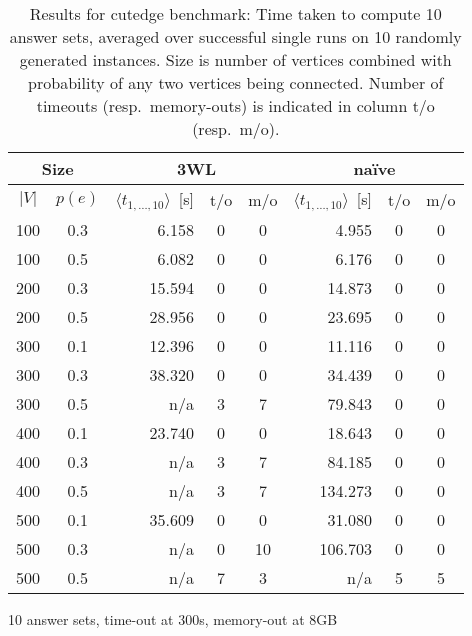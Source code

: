 \documentclass{vutinfth} %
\begin{document}
\begin{table}
\begin{center}
	\begin{tabular}{|cc||rcc|rcc|}
\hline
\multicolumn{2}{|c||}{Size} & \multicolumn{3}{c|}{3WL} & \multicolumn{3}{c|}{na\"{i}ve} \\
\hline
$|V|$ & $p(e)$& $\langle t_{1, \ldots, 10} \rangle$~[s]&t/o&m/o& $\langle t_{1, \ldots, 10} \rangle$~[s]&t/o&m/o\\
\hline
\hline
100 & 0.3 & 	  6.158 & 0 &  0 &	  4.955 & 0 & 0 \\
100 & 0.5 & 	  6.082 & 0 &  0 &	  6.176 & 0 & 0 \\
200 & 0.3 & 	 15.594 & 0 &  0 &	 14.873 & 0 & 0 \\
200 & 0.5 & 	 28.956 & 0 &  0 &	 23.695 & 0 & 0 \\
300 & 0.1 & 	 12.396 & 0 &  0 &	 11.116 & 0 & 0 \\
300 & 0.3 & 	 38.320 & 0 &  0 &	 34.439 & 0 & 0 \\
300 & 0.5 & 	    n/a & 3 &  7 &	 79.843 & 0 & 0 \\
400 & 0.1 & 	 23.740 & 0 &  0 &	 18.643 & 0 & 0 \\
400 & 0.3 & 	    n/a & 3 &  7 &	 84.185 & 0 & 0 \\
400 & 0.5 & 	    n/a & 3 &  7 &	134.273 & 0 & 0 \\
500 & 0.1 & 	 35.609 & 0 &  0 &	 31.080 & 0 & 0 \\
500 & 0.3 & 	    n/a & 0 & 10 &	106.703 & 0 & 0 \\
500 & 0.5 & 	    n/a & 7 &  3 &	    n/a & 5 & 5 \\
\hline
	\end{tabular}

\hspace{3mm}

10 answer sets, time-out at 300s, memory-out at 8GB
	
	\end{center}
	
	\caption[Results for cutedge benchmark]{Results for cutedge benchmark: Time taken to compute 10 answer sets, averaged over successful single runs on 10 randomly generated instances. Size is number of vertices combined with probability of any two vertices being connected. Number of timeouts (resp.~memory-outs) is indicated in column t/o (resp.~m/o).}
	\label{tbl:cut}
\end{table}
\end{document}
